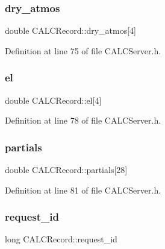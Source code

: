 \subsubsection{\texorpdfstring{dry\+\_\+atmos}{dry\_atmos}}
{\footnotesize\ttfamily double C\+A\+L\+C\+Record\+::dry\+\_\+atmos\mbox{[}4\mbox{]}}



Definition at line 75 of file C\+A\+L\+C\+Server.\+h.

\mbox{\label{struct_c_a_l_c_record_aa639dc99781303cbcecb1591d1c2eb2b}} 
\subsubsection{\texorpdfstring{el}{el}}
{\footnotesize\ttfamily double C\+A\+L\+C\+Record\+::el\mbox{[}4\mbox{]}}



Definition at line 78 of file C\+A\+L\+C\+Server.\+h.

\mbox{\label{struct_c_a_l_c_record_a11aec7337258d57178ff5bd055221135}} 
\subsubsection{\texorpdfstring{partials}{partials}}
{\footnotesize\ttfamily double C\+A\+L\+C\+Record\+::partials\mbox{[}28\mbox{]}}



Definition at line 81 of file C\+A\+L\+C\+Server.\+h.

\mbox{\label{struct_c_a_l_c_record_aef69993a7851234d7e13e45a5b2d2304}} 
\subsubsection{\texorpdfstring{request\+\_\+id}{request\_id}}
{\footnotesize\ttfamily long C\+A\+L\+C\+Record\+::request\+\_\+id}



